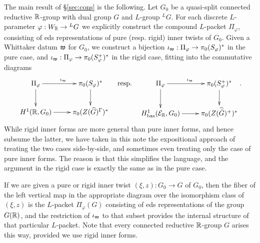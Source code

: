 \documentclass{article}
\theoremstyle{definition}
\numberwithin{equation}{section}
\renewcommand{\-}{\hyp{}}
\begin{document}
The main result of \S\ref{sec:cons} is the following. Let $G_0$ be a quasi-split connected reductive $\mathbb{R}$-group with dual group $G$ and $L$-group $^LG$. For each discrete $L$-parameter $\varphi : W_{\mathbb{R}} \to {^LG}$ we explicitly construct the compound $L$-packet $\Pi_\varphi$, consisting of eds representations of pure (resp. rigid) inner twists of $G_0$. Given a Whittaker datum $\mathfrak{w}$ for $G_0$, we construct a bijection $\iota_{\mathfrak{w}} : \Pi_\varphi \to \pi_0(S_\varphi)^*$ in the pure case, and $\iota_{\mathfrak{w}} : \Pi_\varphi \to \pi_0(S_\varphi^+)^*$ in the rigid case, fitting into the commutative diagrams
\[ \xymatrix{
	\Pi_\varphi\ar[r]^{\iota_\mf{w}}\ar[d]&\pi_0(S_\varphi)^*\ar[d]\\
	H^1(\R,G_0)\ar[r]&\pi_0(Z(\hat G)^\Gamma)^*
}\quad\tx{resp.}\quad
\xymatrix{
	\Pi_\varphi\ar[r]^{\iota_\mf{w}}\ar[d]&\pi_0(S_\varphi^+)^*\ar[d]\\
	H^1_\tx{bas}(\mc{E}_\R,G_0)\ar[r]&\pi_0(Z(\hat{\bar G})^+)^*
}.
\]
While rigid inner forms are more general than pure inner forms, and hence subsume the latter, we have taken in this note the expositional approach of treating the two cases side-by-side, and sometimes even treating only the case of pure inner forms. The reason is that this simplifies the language, and the argument in the rigid case is exactly the same as in the pure case.

If we are given a pure or rigid inner twist $(\xi,z) : G_0 \to G$  of $G_0$, then the fiber of the left vertical map in the appropriate diagram over the isomorphism class of $(\xi,z)$ is the $L$-packet $\Pi_\varphi(G)$ consisting of eds representations of the group $G(\mathbb{R})$, and the restriction of $\iota_{\mathfrak{w}}$ to that subset provides the internal structure of that particular $L$-packet. Note that every connected reductive $\mathbb{R}$-group $G$ arises this way, provided we use rigid inner forms.
\end{document}
